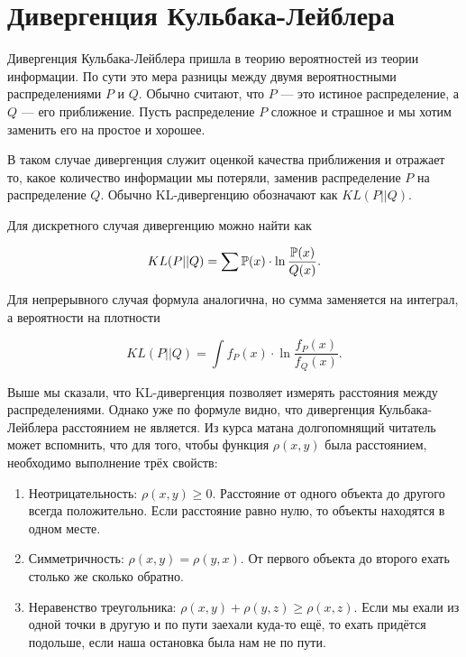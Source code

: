 \documentclass[12pt, a4paper, oneside]{article}
\begin{document}
\section{Дивергенция Кульбака-Лейблера} 

Дивергенция Кульбака-Лейблера пришла в теорию вероятностей из теории информации. По сути  это мера разницы между двумя вероятностными распределениями $P$ и $Q$.  Обычно считают, что $P$ --- это истиное распределение, а $Q$ --- его приближение.  Пусть распределение $P$ сложное и страшное и мы хотим заменить его на простое и хорошее. 


В таком случае дивергенция служит оценкой качества приближения и отражает то, какое количество информации мы потеряли, заменив распределение $P$ на распределение $Q$.  Обычно KL-дивергенцию обозначают как $KL(P || Q)$. 


Для дискретного случая дивергенцию можно найти как 

\[ KL(P || Q) = \sum  \mathbb{P}(x) \cdot \ln \frac{ \mathbb{P}(x)}{Q(x)}. \]

Для непрерывного случая формула аналогична, но сумма заменяется на интеграл, а вероятности на плотности


\[ KL(P || Q) = \int f_P(x) \cdot \ln \frac{ f_P(x)}{f_Q(x)}. \]

Выше мы сказали, что KL-дивергенция позволяет измерять расстояния между распределениями. Однако уже по формуле видно, что дивергенция Кульбака-Лейблера расстоянием не является.  Из курса матана долгопомнящий читатель может вспомнить, что для того, чтобы функция $\rho(x,y)$ была расстоянием, необходимо выполнение трёх свойств: 

\begin{enumerate}
\item   Неотрицательность: $\rho(x,y) \ge 0$. Расстояние от одного объекта до другого всегда положительно. Если расстояние равно нулю, то объекты находятся в одном месте. 

\item  Симметричность: $\rho(x,y) = \rho(y,x)$. От первого объекта до второго ехать столько же сколько обратно. 

\item  Неравенство треугольника: $\rho(x,y) + \rho(y,z) \ge \rho(x,z)$. Если мы ехали из одной точки в другую и по пути заехали куда-то ещё, то ехать придётся подольше, если наша остановка была нам не по пути. 
\end{enumerate}
\end{document}
